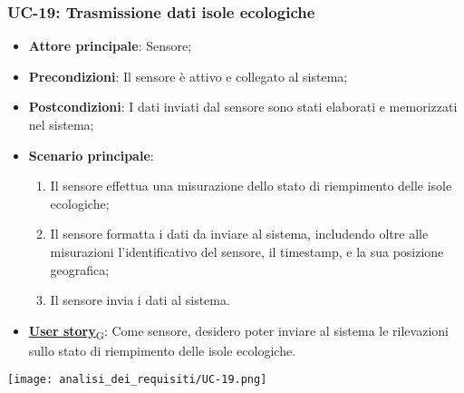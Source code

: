 \subsubsection{UC-19: Trasmissione dati isole ecologiche}
\begin{itemize}
	\item \textbf{Attore principale}: Sensore;
	\item \textbf{Precondizioni}: Il sensore è attivo e collegato al sistema;
	\item \textbf{Postcondizioni}: I dati inviati dal sensore sono stati elaborati e memorizzati nel sistema;
	\item \textbf{Scenario principale}:
	      \begin{enumerate}
		      \item Il sensore effettua una misurazione dello stato di riempimento delle isole ecologiche;
		      \item Il sensore formatta i dati da inviare al sistema, includendo oltre alle misurazioni l'identificativo del sensore,
		            il timestamp, e la sua posizione geografica;
		      \item Il sensore invia i dati al sistema.
	      \end{enumerate}
	\item \href{https://7last.github.io/docs/rtb/documentazione-interna/glossario\#user-story}{\textbf{User story}\textsubscript{G}}: Come sensore, desidero poter inviare al sistema le rilevazioni sullo stato di riempimento delle isole ecologiche.
\end{itemize}

\begin{center}
	\texttt{[image: analisi\_dei\_requisiti/UC-19.png]}
\end{center}

